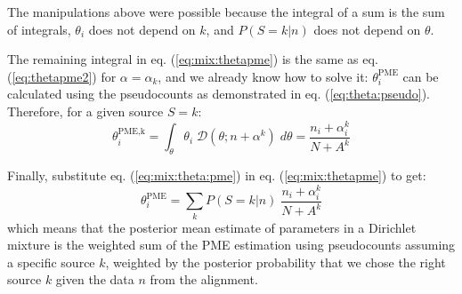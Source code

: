 The manipulations above were possible because the integral of a sum is the sum of integrals, $\theta_i$ does not depend on $k$, and $P(S=k|n)$ does not depend on $\theta$.

The remaining integral in eq. (\ref{eq:mix:thetapme}) is the same as eq. (\ref{eq:thetapme2}) for $\alpha=\alpha_k$, and we already know how to solve it: $\theta_i^{\text{PME}}$ can be calculated using the pseudocounts as demonstrated in eq. (\ref{eq:theta:pseudo}). Therefore, for a given source $S=k$:
%
\begin{equation}
\theta_i^{\text{PME,k}} = 
\int_\theta \theta_i \; \mathcal{D}(\theta; n + \alpha^k)
   \; d \theta
=
\frac{n_i + \alpha_i^k}{N+A^k}
\label{eq:mix:theta:pme}
\end{equation}

Finally, substitute eq. (\ref{eq:mix:theta:pme}) in eq. (\ref{eq:mix:thetapme}) to get:
\begin{equation}
\boxed{\theta_i^{\text{PME}} = \sum_{k} P(S=k|n) \; 
                             \frac{n_i + \alpha_i^k}{N+A^k}}
\label{eq:mix:theta:pseudo}
\end{equation}
%
which means that the posterior mean estimate of parameters in a Dirichlet mixture is the weighted sum of the PME estimation using pseudocounts assuming a specific source $k$, weighted by the posterior probability that we chose the right source $k$ given the data $n$ from the alignment.
